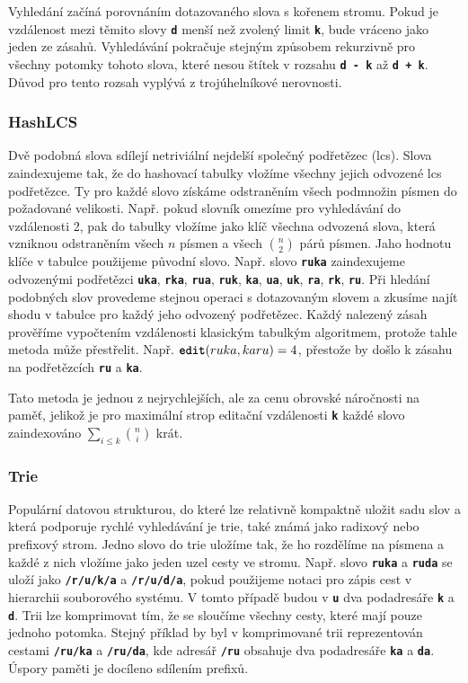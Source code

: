 \documentclass[11pt,letterpaper,oneside,openright]{book}
\newcommand{\bftt}[1]{\texttt{\textbf{#1}}}
\begin{document}
Vyhledání začíná porovnáním dotazovaného slova s kořenem stromu. Pokud je
vzdálenost mezi těmito slovy \bftt{d} menší než zvolený limit \bftt{k}, bude
vráceno jako jeden ze zásahů. Vyhledávání pokračuje stejným způsobem rekurzivně
pro všechny potomky tohoto slova, které nesou štítek v rozsahu \bftt{d - k} až
\bftt{d + k}. Důvod pro tento rozsah vyplývá z trojúhelníkové nerovnosti.

\subsubsection{HashLCS}
Dvě podobná slova sdílejí netriviální nejdelší společný podřetězec (lcs). Slova
zaindexujeme tak, že do hashovací tabulky vložíme všechny jejich odvozené lcs
podřetězce. Ty pro každé slovo získáme odstraněním všech podmnožin písmen do
požadované velikosti. Např. pokud slovník omezíme pro vyhledávání do
vzdálenosti 2, pak do tabulky vložíme jako klíč všechna odvozená slova, která
vzniknou odstraněním všech $n$ písmen a všech ${n \choose 2}$ párů písmen. Jaho
hodnotu klíče v tabulce použijeme původní slovo. Např. slovo \bftt{ruka}
zaindexujeme odvozenými podřetězci \bftt{uka}, \bftt{rka}, \bftt{rua},
\bftt{ruk}, \bftt{ka}, \bftt{ua}, \bftt{uk}, \bftt{ra}, \bftt{rk}, \bftt{ru}.
Při hledání podobných slov provedeme stejnou operaci s dotazovaným slovem a
zkusíme najít shodu v tabulce pro každý jeho odvozený podřetězec. Každý
nalezený zásah prověříme vypočtením vzdálenosti klasickým tabulkým algoritmem,
protože tahle metoda může přestřelit. Např. $\bftt{edit}(ruka, karu) = 4$,
přestože by došlo k zásahu na podřetězcích \bftt{ru} a \bftt{ka}.

Tato metoda je jednou z nejrychlejších, ale za cenu obrovské náročnosti na
paměť, jelikož je pro maximální strop editační vzdálenosti \bftt{k} každé slovo
zaindexováno $\sum_{i \leq k} {n \choose i}$ krát.


\subsubsection{Trie}
Populární datovou strukturou, do které lze relativně kompaktně uložit sadu slov
a která podporuje rychlé vyhledávání je trie, také známá jako radixový nebo
prefixový strom. Jedno slovo do trie uložíme tak, že ho rozdělíme na písmena a
každé z nich vložíme jako jeden uzel cesty ve stromu. Např. slovo \bftt{ruka} a
\bftt{ruda} se uloží jako \bftt{/r/u/k/a} a \bftt{/r/u/d/a}, pokud použijeme
notaci pro zápis cest v hierarchii souborového systému. V tomto případě budou v
 \bftt{u} dva podadresáře \bftt{k} a \bftt{d}. Trii lze
komprimovat tím, že se sloučíme všechny cesty, které mají pouze jednoho
potomka. Stejný příklad by byl v komprimované trii reprezentován cestami
\bftt{/ru/ka} a \bftt{/ru/da}, kde adresář \bftt{/ru} obsahuje dva podadresáře
\bftt{ka} a \bftt{da}. Úspory paměti je docíleno sdílením prefixů.
\end{document}
